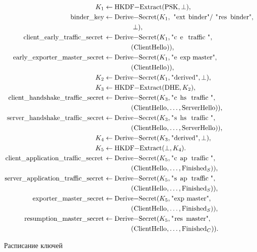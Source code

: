 \begin{figure}[hbt]
\begin{align*}
K_1 &\gets\code{HKDF-Extract}(\text{PSK}, \perp),\\
\code{binder_key}&\gets\code{Derive-Secret}(K_1,
  \text{\str{ext binder}/\str{res binder}},\\
  &\hspace{40pt}\perp),\\
%
\code{client_early_traffic_secret}&\gets\code{Derive-Secret}(K_1,
  \str{c e traffic},\\
  &\hspace{40pt}(\code{ClientHello})),\\
%
\code{early_exporter_master_secret}&\gets\code{Derive-Secret}(K_1,
  \str{e exp master},\\
  &\hspace{40pt}(\code{ClientHello})),\\
%
K_2 &\gets\code{Derive-Secret}(K_1, \str{derived}, \perp),\\
K_3 &\gets\code{HKDF-Extract}(\text{DHE}, K_2),\\
%
\code{client_handshake_traffic_secret}&\gets\code{Derive-Secret}(K_3,
  \str{c hs traffic},\\
  &\hspace{40pt}(\code{ClientHello},\dots,\code{ServerHello})),\\
%
\code{server_handshake_traffic_secret}&\gets\code{Derive-Secret}(K_3,
  \str{s hs traffic},\\
  &\hspace{40pt}(\code{ClientHello},\dots,\code{ServerHello})),\\
%
K_4 &\gets\code{Derive-Secret}(K_3, \str{derived}, \perp),\\
K_5 &\gets\code{HKDF-Extract}(\perp, K_4).\\
%
\code{client_application_traffic_secret}&\gets\code{Derive-Secret}(K_5,
  \str{c ap traffic},\\
  &\hspace{40pt}(\code{ClientHello},\dots,\code{Finished}_S)),\\
%
\code{server_application_traffic_secret}&\gets\code{Derive-Secret}(K_5,
  \str{s ap traffic},\\
  &\hspace{40pt}(\code{ClientHello},\dots,\code{Finished}_S)),\\
%
\code{exporter_master_secret}&\gets\code{Derive-Secret}(K_5,
  \str{exp master},\\
  &\hspace{40pt}(\code{ClientHello},\dots,\code{Finished}_S)),\\
%
\code{resumption_master_secret}&\gets\code{Derive-Secret}(K_5,
  \str{res master},\\
  &\hspace{40pt}(\code{ClientHello},\dots,\code{Finished}_C)).\\
\end{align*}
\caption{Расписание ключей}\label{Fig.CRYPTO.Schedule}
\end{figure}

